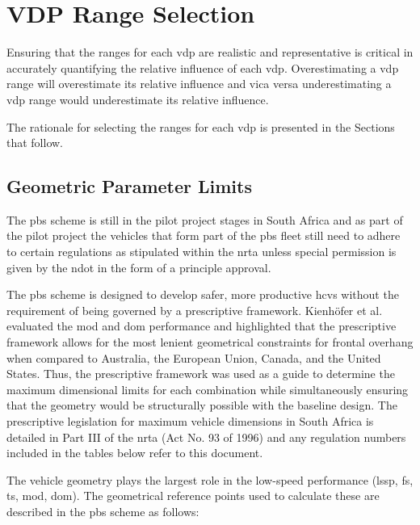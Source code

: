 \chapter{VDP Range Selection}\label{chapter:parameter-range-selection}

Ensuring that the ranges for each \gls{vdp} are realistic and representative is critical in accurately quantifying the relative influence of each \gls{vdp}. Overestimating a \gls{vdp} range will overestimate its relative influence and vica versa underestimating a \gls{vdp} range would underestimate its relative influence.

The rationale for selecting the ranges for each \gls{vdp} is presented in the Sections that follow.

\section{Geometric Parameter Limits}\label{section:geometric-limits}

The \gls{pbs} scheme is still in the pilot project stages in South Africa and as part of the pilot project the vehicles that form part of the \gls{pbs} fleet still need to adhere to certain regulations as stipulated within the \gls{nrta} unless special permission is given by the \gls{ndot} in the form of a principle approval.

The \gls{pbs} scheme is designed to develop safer, more productive \glspl{hcv} without the requirement of being governed by a prescriptive framework. Kienh{\"o}fer et al. \cite{Kienhofer2014} evaluated the \gls{mod} and \gls{dom} performance and highlighted that the prescriptive framework allows for the most lenient geometrical constraints for frontal overhang when compared to Australia, the European Union, Canada, and the United States. Thus, the prescriptive framework was used as a guide to determine the maximum dimensional limits for each combination while simultaneously ensuring that the geometry would be structurally possible with the baseline design. The prescriptive legislation for maximum vehicle dimensions in South Africa is detailed in Part III of the \gls{nrta} (Act No. 93 of 1996) \cite{NationalDepartmentofTransport2003} and any regulation numbers included in the tables below refer to this document.

The vehicle geometry plays the largest role in the low-speed performance (\gls{lssp}, \gls{fs}, \gls{ts}, \gls{mod}, \gls{dom}). The geometrical reference points used to calculate these are described in the \gls{pbs} scheme \cite{NationalTransportCommission2008} as follows:

